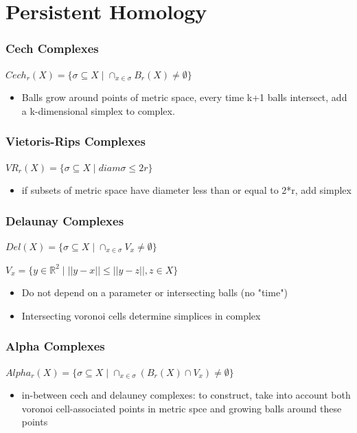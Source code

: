 \documentclass[ma]{uncgdissertationexp2}
\theoremstyle{plain}
\theoremstyle{definition}
\theoremstyle{remark}
\begin{document}
\section{Persistent Homology}

\subsubsection{Cech Complexes}
$Cech_{r}(X) = \{\sigma \subseteq X \mid \cap_{x \in \sigma} B_{r}(X) \not= \emptyset\}$
\begin{itemize}
\item Balls grow around points of metric space, every time k+1 balls intersect, add a k-dimensional simplex to complex.
\end{itemize}

\subsubsection{Vietoris-Rips Complexes}
$VR_{r}(X) = \{\sigma \subseteq X \mid diam\sigma \leq 2r \}$
\begin{itemize}
\item if subsets of metric space have diameter less than or equal to 2*r, add simplex
\end{itemize}

\subsubsection{Delaunay Complexes}
$Del(X) = \{\sigma \subseteq X \mid \cap_{x \in \sigma} V_{x} \not= \emptyset\}$

$V_{x} = \{y \in \mathbb{R}^{2} \mid ||y-x|| \leq  ||y-z||, z \in X\}$
\begin{itemize}
\item Do not depend on a parameter or intersecting balls (no "time")
\item Intersecting voronoi cells determine simplices in complex
\end{itemize}

\subsubsection{Alpha Complexes}
$Alpha_{r}(X)=\{\sigma \subseteq X \mid \cap_{x\in \sigma} (B_{r}(X) \cap V_{x}) \not= \emptyset\}$
\begin{itemize}
\item in-between cech and delauney complexes: to construct, take into account both voronoi cell-associated points in metric spce and growing balls around these points
\end{itemize}
\end{document}
